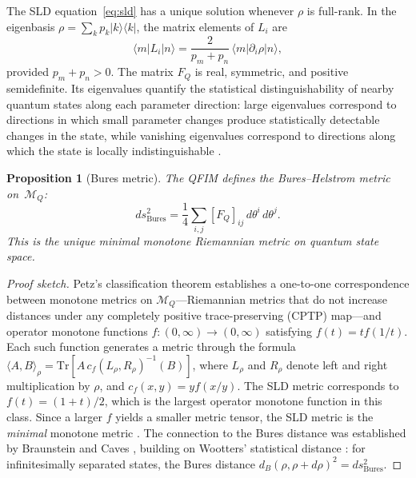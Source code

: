 \documentclass[12pt,a4paper]{article}
\newtheorem{proposition}[theorem]{Proposition}
\theoremstyle{definition}
\theoremstyle{remark}
\begin{document}
The SLD equation~\eqref{eq:sld} has a unique solution whenever $\rho$ is full-rank. In the eigenbasis $\rho = \sum_k p_k \lvert k \rangle\!\langle k \rvert$, the matrix elements of $L_i$ are
\begin{equation}
\label{eq:sld-matrix}
\langle m \rvert L_i \lvert n \rangle = \frac{2}{p_m + p_n}\,\langle m \rvert \partial_i \rho \lvert n \rangle,
\end{equation}
provided $p_m + p_n > 0$. The matrix $F_Q$ is real, symmetric, and positive semidefinite. Its eigenvalues quantify the statistical distinguishability of nearby quantum states along each parameter direction: large eigenvalues correspond to directions in which small parameter changes produce statistically detectable changes in the state, while vanishing eigenvalues correspond to directions along which the state is locally indistinguishable \cite{liu2020quantum,petz2011introduction}.

\begin{proposition}[Bures metric]
\label{prop:bures}
The QFIM defines the Bures--Helstrom metric on~$\mathcal{M}_Q$:
\begin{equation}
\label{eq:bures}
ds^2_{\mathrm{Bures}} = \frac{1}{4}\sum_{i,j} [F_Q]_{ij}\, d\theta^i\, d\theta^j.
\end{equation}
This is the unique minimal monotone Riemannian metric on quantum state space.
\end{proposition}

\begin{proof}[Proof sketch]
Petz's classification theorem \cite{petz1996monotone} establishes a one-to-one correspondence between monotone metrics on $\mathcal{M}_Q$---Riemannian metrics that do not increase distances under any completely positive trace-preserving (CPTP) map---and operator monotone functions $f:(0,\infty) \to (0,\infty)$ satisfying $f(t) = t f(1/t)$. Each such function generates a metric through the formula $\langle A, B \rangle_\rho = \mathrm{Tr}[A\, c_f(L_\rho, R_\rho)^{-1}(B)]$, where $L_\rho$ and $R_\rho$ denote left and right multiplication by $\rho$, and $c_f(x,y) = y f(x/y)$. The SLD metric corresponds to $f(t) = (1+t)/2$, which is the largest operator monotone function in this class. Since a larger $f$ yields a smaller metric tensor, the SLD metric is the \emph{minimal} monotone metric \cite{petz1996monotone}. The connection to the Bures distance \cite{bures1969extension,uhlmann1976transition} was established by Braunstein and Caves \cite{braunstein1994statistical}, building on Wootters' statistical distance \cite{wootters1981statistical}: for infinitesimally separated states, the Bures distance $d_B(\rho, \rho + d\rho)^2 = ds^2_{\mathrm{Bures}}$.
\end{proof}
\end{document}
